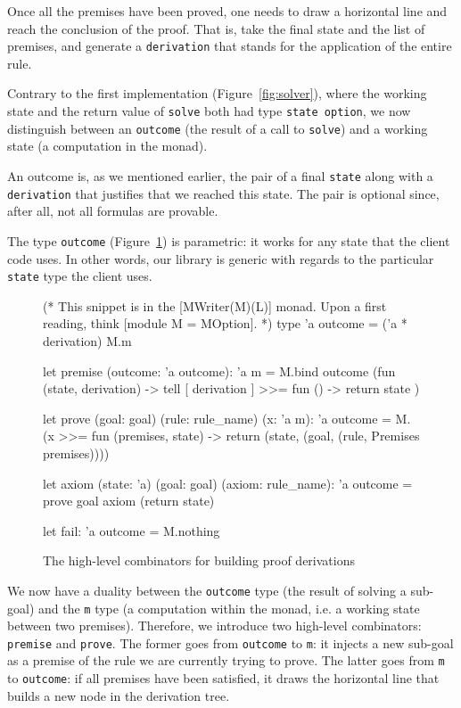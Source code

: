 \documentclass{easychair}
\def\li{\lstinline}
\newcommand{\fref}[1]{Figure~\ref{fig:#1}}
\begin{document}
Once all the premises have been proved, one needs to draw a horizontal line and
reach the conclusion of the proof. That is, take the final state and the list of
premises, and generate a \li+derivation+ that stands for the application of the
entire rule.

Contrary to the first implementation (\fref{solver}), where the working state
and the return value of \li+solve+ both had type \li+state option+, we now
distinguish between an \li+outcome+ (the result of a call to \li+solve+) and a
working state (a computation in the monad).

An outcome is, as we mentioned earlier, the pair of a final \li+state+ along
with a \li+derivation+ that justifies that we reached this state. The pair is
optional since, after all, not all formulas are provable.

The type \li+outcome+ (\fref{combinators}) is parametric: it works for any
state that the client code uses. In other words, our library is generic with
regards to the particular \li+state+ type the client uses.

\begin{figure}
  \centering
\begin{ocaml}
(* This snippet is in the [MWriter(M)(L)] monad. Upon a first reading, think
   [module M = MOption]. *)
type 'a outcome = ('a * derivation) M.m

let premise (outcome: 'a outcome): 'a m =
  M.bind outcome (fun (state, derivation) ->
    tell [ derivation ] >>= fun () ->
    return state
  )

let prove (goal: goal) (rule: rule_name) (x: 'a m): 'a outcome =
  M.(x >>= fun (premises, state) ->
    return (state, (goal, (rule, Premises premises))))

let axiom (state: 'a) (goal: goal) (axiom: rule_name): 'a outcome =
  prove goal axiom (return state)

let fail: 'a outcome =
  M.nothing
\end{ocaml}
  \caption{The high-level combinators for building proof derivations}
  \label{fig:combinators}
\end{figure}

We now have a duality between the \li+outcome+ type (the result of solving a
sub-goal) and the \li+m+ type (a computation within the monad, i.e. a working
state between two premises). Therefore, we introduce two high-level combinators:
\li+premise+ and \li+prove+. The former goes from \li+outcome+ to \li+m+: it
injects a new sub-goal as a premise of the rule we are currently trying to
prove. The latter goes from \li+m+ to \li+outcome+: if all premises have been
satisfied, it draws the horizontal line that builds a new node in the derivation
tree.
\end{document}
